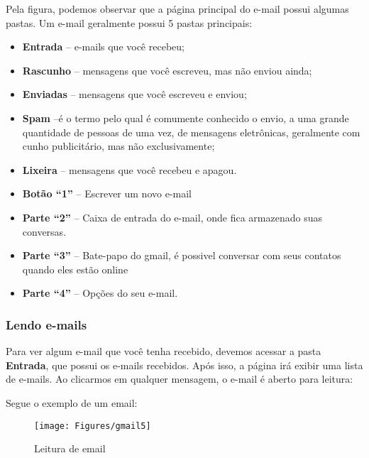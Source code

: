 \documentclass[hidelinks,12pt]{article}
\begin{document}
Pela figura, podemos observar que a página principal do e-mail possui algumas pastas. Um e-mail geralmente possui 5 pastas principais:

\begin{itemize}
	\item \textbf{Entrada} – e-mails que você recebeu;

	\item \textbf{Rascunho} – mensagens que você escreveu, mas não enviou ainda;

	\item \textbf{Enviadas} – mensagens que você escreveu e enviou;

	\item \textbf{Spam} –é o termo pelo qual é comumente conhecido o envio, a uma grande quantidade de pessoas de uma vez, de mensagens eletrônicas, geralmente com cunho publicitário, mas não exclusivamente;

	\item \textbf{Lixeira} – mensagens que você recebeu e apagou.

	\item \textbf{Botão “1”} – Escrever um novo e-mail

	\item \textbf{Parte “2”} – Caixa de entrada do e-mail, onde fica armazenado suas conversas.

	\item \textbf{Parte “3”} – Bate-papo do gmail, é possivel conversar com seus contatos quando eles estão online

	\item \textbf{Parte “4”} – Opções do seu e-mail.

\end{itemize}


\subsubsection{Lendo e-mails}

Para ver algum e-mail que você tenha recebido, devemos acessar a pasta \textbf{Entrada}, que possui os e-mails recebidos. Após isso, a página irá exibir uma lista de e-mails. Ao clicarmos em qualquer mensagem, o e-mail é aberto para leitura:

Segue o exemplo de um email:

\begin{figure}[!h]
	\centering
	\texttt{[image: Figures/gmail5]}
	\label{fig:gmail5}
	\caption{Leitura de email}
\end{figure}
\end{document}
